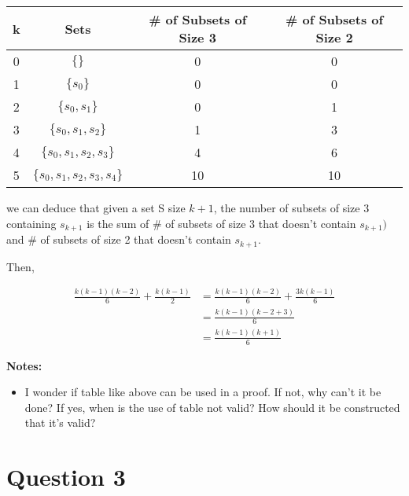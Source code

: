 \documentclass[12pt]{article}
\begin{document}
\begin{itemize}
    \begin{tabular}{|c|c|c|c|}
        \hline
        k & Sets & \# of Subsets of Size 3 & \# of Subsets of Size 2\\
        \hline
        0 & $\{\}$ & 0 & 0\\
        \hline
        1 & $\{s_0\}$ & 0 & 0\\
        \hline
        2 & $\{s_0,s_1\}$ & 0 & 1\\
        \hline
        3 & $\{s_0,s_1,s_2\}$ & 1 & 3\\
        \hline
        4 & $\{s_0,s_1,s_2,s_3\}$ & 4 & 6\\
        \hline
        5 & $\{s_0,s_1,s_2,s_3,s_4\}$ & 10 & 10\\
        \hline
    \end{tabular}

    we can deduce that given a set S size $k+1$, the number of subsets of size 3
    containing $s_{k+1}$ is the sum of \# of subsets of size 3 that doesn't
    contain $s_{k+1})$ and \# of subsets of size 2 that doesn't contain $s_{k+1}$.

    \bigskip

    Then,

    \begin{align}
        \frac{k(k-1)(k-2)}{6} + \frac{k(k-1)}{2} &= \frac{k(k-1)(k-2)}{6} + \frac{3k(k-1)}{6}\\
        &= \frac{k(k-1)(k-2+3)}{6}\\
        &= \frac{k(k-1)(k+1)}{6}
    \end{align}

    \bigskip

    \textbf{Notes:}
    \begin{itemize}
        \item I wonder if table like above can be used in a proof. If not, why
        can't it be done? If yes, when is the use of table not valid? How should
        it be constructed that it's valid?
    \end{itemize}

\end{itemize}

\section*{Question 3}
\end{document}
